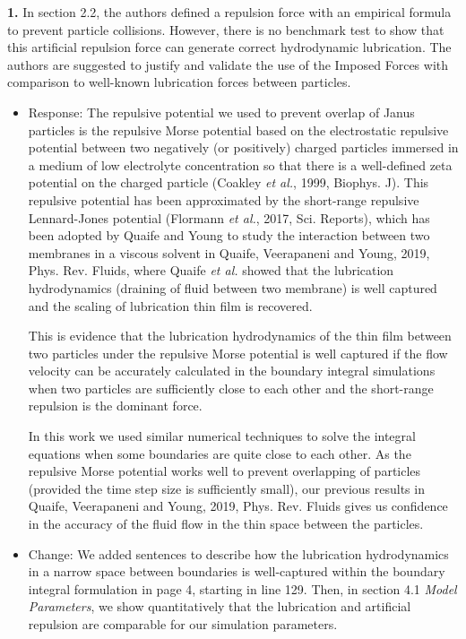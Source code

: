 \documentclass[11pt]{article}
\newcommand{\comment}[1]{{\color{blue} #1}}
\begin{document}
\noindent
\comment{{\bf 1.} In section 2.2, the authors defined a repulsion force with an
empirical formula to prevent particle collisions. However, there is no
benchmark test to show that this artificial repulsion force can generate
correct hydrodynamic lubrication. The authors are suggested to justify
and validate the use of the Imposed Forces with comparison to well-known
lubrication forces between particles.}
\begin{itemize}
  \item Response: The repulsive potential we used to prevent overlap of Janus particles is the repulsive Morse potential based on the electrostatic repulsive potential between two negatively (or positively) charged particles immersed in a medium of low electrolyte concentration so that there is a well-defined zeta potential on the charged particle (Coakley {\sl et al.}, 1999, Biophys. J). This repulsive potential has been approximated by the short-range repulsive Lennard-Jones potential (Flormann {\sl et al.}, 2017, Sci. Reports), which has been adopted by Quaife and Young to study the interaction between two membranes in a viscous solvent in Quaife, Veerapaneni and Young, 2019, Phys. Rev. Fluids, where Quaife {\sl et al.} showed that the lubrication hydrodynamics (draining of fluid between two membrane) is well captured and the scaling of lubrication thin film is recovered. 
  
This is evidence that the lubrication hydrodynamics of the thin film between two particles under the repulsive Morse potential is well captured  if the flow velocity can be accurately calculated in the boundary integral simulations when two particles are sufficiently close to each other and the short-range repulsion is the dominant force. 

In this work we used similar numerical techniques to solve the integral equations when some boundaries are quite close to each other.  As the repulsive Morse potential works well to prevent overlapping of particles (provided the time step size is sufficiently small), our previous results in Quaife, Veerapaneni and Young, 2019, Phys. Rev. Fluids gives us confidence in the accuracy of the fluid flow in the thin space between the particles.

\item Change: We added sentences to describe how the lubrication hydrodynamics in a narrow space between boundaries is well-captured within the boundary integral formulation in page 4, starting in line 129.
  Then, in section 4.1 \textit{Model Parameters}, we show quantitatively that the lubrication and
  artificial repulsion are comparable for our simulation parameters.
\end{itemize}
\end{document}
